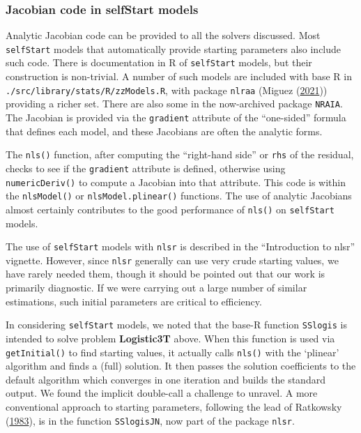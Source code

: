 \hypertarget{jacobian-code-in-selfstart-models}{%
\subsubsection{Jacobian code in selfStart models}\label{jacobian-code-in-selfstart-models}}

Analytic Jacobian code can be provided to all the solvers discussed.
Most \texttt{selfStart} models that automatically provide starting parameters
also include such code. There is documentation in R
of \texttt{selfStart} models, but their construction is non-trivial. A number
of such models are included with base R in \texttt{./src/library/stats/R/zzModels.R},
with package \texttt{nlraa} (Miguez (\protect\hyperlink{ref-MiguezNLRAA2021}{2021})) providing a richer set.
There are also some in the now-archived package \texttt{NRAIA}.
The Jacobian is provided via the \texttt{gradient} attribute of the ``one-sided'' formula
that defines each model, and these Jacobians are often the analytic forms.

The \texttt{nls()} function, after
computing the ``right-hand side'' or \texttt{rhs} of the residual, checks to see if the
\texttt{gradient} attribute is defined, otherwise using \texttt{numericDeriv()} to compute a
Jacobian into that attribute. This code is within the \texttt{nlsModel()} or
\texttt{nlsModel.plinear()} functions. The use of analytic Jacobians
almost certainly contributes to the good performance of \texttt{nls()} on \texttt{selfStart}
models.

The use of \texttt{selfStart} models with
\texttt{nlsr} is described in the ``Introduction to nlsr'' vignette. However, since \texttt{nlsr}
generally can use very crude starting values, we have rarely needed them, though
it should be pointed out that our work is primarily diagnostic. If we were carrying
out a large number of similar estimations, such initial parameters are
critical to efficiency.

In considering \texttt{selfStart} models, we noted that the base-R function \texttt{SSlogis}
is intended to solve problem \textbf{Logistic3T} above. When this function is used
via \texttt{getInitial()} to find
starting values, it actually calls \texttt{nls()} with the `plinear' algorithm
and finds a (full) solution. It then passes the solution coefficients to the default
algorithm which converges in one iteration and builds the standard output.
We found the implicit double-call a challenge to unravel.
A more conventional approach to starting parameters, following the lead of Ratkowsky (\protect\hyperlink{ref-Ratkowsky1983}{1983}),
is in the function \texttt{SSlogisJN}, now part of the package \texttt{nlsr}.

